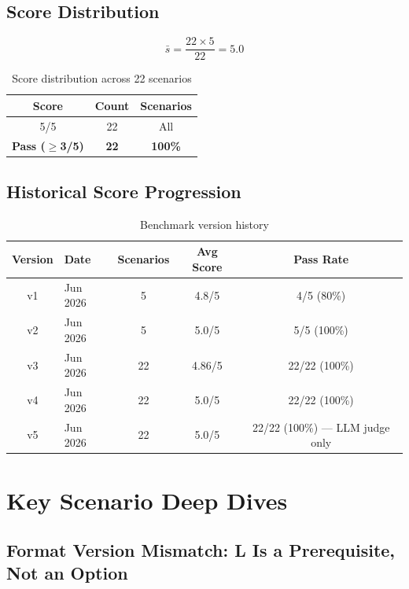 \documentclass[11pt,a4paper]{article}
\begin{document}
\subsection{Score Distribution}

\[
  \bar{s} = \frac{22 \times 5}{22} = 5.0
\]

\begin{table}[ht]
\centering
\caption{Score distribution across 22 scenarios}
\begin{tabular}{ccc}
\toprule
\textbf{Score} & \textbf{Count} & \textbf{Scenarios} \\
\midrule
5/5 & 22 & All \\
\midrule
\textbf{Pass ($\geq$3/5)} & \textbf{22} & \textbf{100\%} \\
\bottomrule
\end{tabular}
\end{table}

\subsection{Historical Score Progression}

\begin{table}[ht]
\centering
\caption{Benchmark version history}
\begin{tabular}{clccc}
\toprule
\textbf{Version} & \textbf{Date} & \textbf{Scenarios} & \textbf{Avg Score} & \textbf{Pass Rate} \\
\midrule
v1 & Jun 2026 & 5  & 4.8/5 & 4/5  (80\%) \\
v2 & Jun 2026 & 5  & 5.0/5 & 5/5  (100\%) \\
v3 & Jun 2026 & 22 & 4.86/5 & 22/22 (100\%) \\
v4 & Jun 2026 & 22 & 5.0/5 & 22/22 (100\%) \\
v5 & Jun 2026 & 22 & 5.0/5 & 22/22 (100\%) — LLM judge only \\
\bottomrule
\end{tabular}
\end{table}

\section{Key Scenario Deep Dives}

\subsection{Format Version Mismatch: L Is a Prerequisite, Not an Option}
\end{document}
